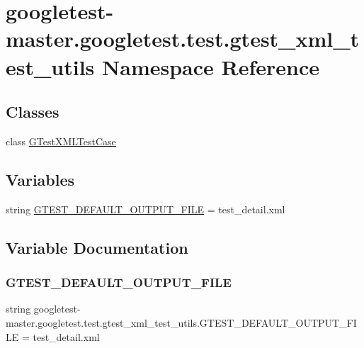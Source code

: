 \hypertarget{namespacegoogletest-master_1_1googletest_1_1test_1_1gtest__xml__test__utils}{}\section{googletest-\/master.googletest.\+test.\+gtest\+\_\+xml\+\_\+test\+\_\+utils Namespace Reference}
\label{namespacegoogletest-master_1_1googletest_1_1test_1_1gtest__xml__test__utils}
\subsection*{Classes}
\begin{DoxyCompactItemize}
\item 
class \mbox{\hyperlink{classgoogletest-master_1_1googletest_1_1test_1_1gtest__xml__test__utils_1_1_g_test_x_m_l_test_case}{G\+Test\+X\+M\+L\+Test\+Case}}
\end{DoxyCompactItemize}
\subsection*{Variables}
\begin{DoxyCompactItemize}
\item 
string \mbox{\hyperlink{namespacegoogletest-master_1_1googletest_1_1test_1_1gtest__xml__test__utils_a0717f0f39ae3081e8a64864e2bec4773}{G\+T\+E\+S\+T\+\_\+\+D\+E\+F\+A\+U\+L\+T\+\_\+\+O\+U\+T\+P\+U\+T\+\_\+\+F\+I\+LE}} = \textquotesingle{}test\+\_\+detail.\+xml\textquotesingle{}
\end{DoxyCompactItemize}


\subsection{Variable Documentation}
\mbox{\label{namespacegoogletest-master_1_1googletest_1_1test_1_1gtest__xml__test__utils_a0717f0f39ae3081e8a64864e2bec4773}} 
\subsubsection{\texorpdfstring{GTEST\_DEFAULT\_OUTPUT\_FILE}{GTEST\_DEFAULT\_OUTPUT\_FILE}}
{\footnotesize\ttfamily string googletest-\/master.\+googletest.\+test.\+gtest\+\_\+xml\+\_\+test\+\_\+utils.\+G\+T\+E\+S\+T\+\_\+\+D\+E\+F\+A\+U\+L\+T\+\_\+\+O\+U\+T\+P\+U\+T\+\_\+\+F\+I\+LE = \textquotesingle{}test\+\_\+detail.\+xml\textquotesingle{}}

